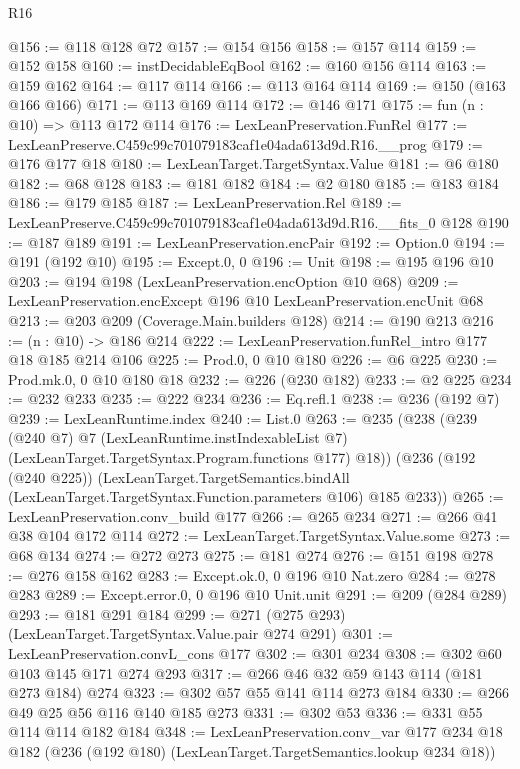 \begin{lexlean}{R16}
\begin{coremodule}
@156 := @118 @128 @72
@157 := @154 @156
@158 := @157 @114
@159 := @152 @158
@160 := instDecidableEqBool
@162 := @160 @156 @114
@163 := @159 @162
@164 := @117 @114
@166 := @113 @164 @114
@169 := @150 (@163 @166 @166)
@171 := @113 @169 @114
@172 := @146 @171
@175 := fun (n : @10) => @113 @172 @114
@176 := LexLeanPreservation.FunRel
@177 := LexLeanPreserve.C459c99c701079183caf1e04ada613d9d.R16.__prog
@179 := @176 @177 @18
@180 := LexLeanTarget.TargetSyntax.Value
@181 := @6 @180
@182 := @68 @128
@183 := @181 @182
@184 := @2 @180
@185 := @183 @184
@186 := @179 @185
@187 := LexLeanPreservation.Rel
@189 := LexLeanPreserve.C459c99c701079183caf1e04ada613d9d.R16.__fits_0 @128
@190 := @187 @189
@191 := LexLeanPreservation.encPair
@192 := Option.{0}
@194 := @191 (@192 @10)
@195 := Except.{0, 0}
@196 := Unit
@198 := @195 @196 @10
@203 := @194 @198 (LexLeanPreservation.encOption @10 @68)
@209 := LexLeanPreservation.encExcept @196 @10 LexLeanPreservation.encUnit @68
@213 := @203 @209 (Coverage.Main.builders @128)
@214 := @190 @213
@216 := (n : @10) -> @186 @214
@222 := LexLeanPreservation.funRel_intro @177 @18 @185 @214 @106
@225 := Prod.{0, 0} @10 @180
@226 := @6 @225
@230 := Prod.mk.{0, 0} @10 @180 @18
@232 := @226 (@230 @182)
@233 := @2 @225
@234 := @232 @233
@235 := @222 @234
@236 := Eq.refl.{1}
@238 := @236 (@192 @7)
@239 := LexLeanRuntime.index
@240 := List.{0}
@263 := @235
    (@238
      (@239
        (@240 @7)
        @7
        (LexLeanRuntime.instIndexableList @7)
        (LexLeanTarget.TargetSyntax.Program.functions @177)
        @18))
    (@236
      (@192 (@240 @225))
      (LexLeanTarget.TargetSemantics.bindAll
        (LexLeanTarget.TargetSyntax.Function.parameters @106)
        @185
        @233))
@265 := LexLeanPreservation.conv_build @177
@266 := @265 @234
@271 := @266 @41 @38 @104 @172 @114
@272 := LexLeanTarget.TargetSyntax.Value.some
@273 := @68 @134
@274 := @272 @273
@275 := @181 @274
@276 := @151 @198
@278 := @276 @158 @162
@283 := Except.ok.{0, 0} @196 @10 Nat.zero
@284 := @278 @283
@289 := Except.error.{0, 0} @196 @10 Unit.unit
@291 := @209 (@284 @289)
@293 := @181 @291 @184
@299 := @271 (@275 @293) (LexLeanTarget.TargetSyntax.Value.pair @274 @291)
@301 := LexLeanPreservation.convL_cons @177
@302 := @301 @234
@308 := @302 @60 @103 @145 @171 @274 @293
@317 := @266 @46 @32 @59 @143 @114 (@181 @273 @184) @274
@323 := @302 @57 @55 @141 @114 @273 @184
@330 := @266 @49 @25 @56 @116 @140 @185 @273
@331 := @302 @53
@336 := @331 @55 @114 @114 @182 @184
@348 := LexLeanPreservation.conv_var
    @177
    @234
    @18
    @182
    (@236 (@192 @180) (LexLeanTarget.TargetSemantics.lookup @234 @18))

\end{coremodule}
\end{lexlean}
